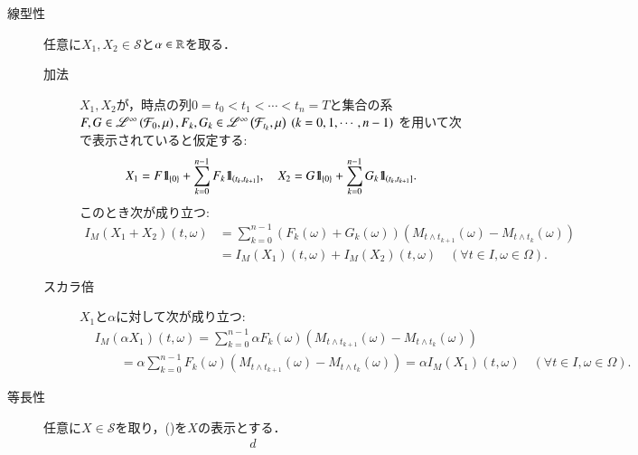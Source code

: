 	\begin{prf}\mbox{}
		\begin{description}
			\item[線型性]
				任意に$X_1,X_2 \in \mathcal{S}$と$\alpha \in \mathbb{R}$を取る．
				\begin{description}
					\item[加法]
						$X_1,X_2$が，時点の列$0=t_0<t_1<\cdots<t_n = T$と集合の系$F,G \in \mathscr{L}^{\infty} \left(\mathcal{F}_0,\mu\right),
						F_k,G_k \in \mathscr{L}^{\infty} \left(\mathcal{F}_{t_k},\mu\right)\ (k=0,1,\cdots,n-1)$
						を用いて次で表示されていると仮定する:
						\begin{align}
							X_1 = F \mbox{1}\hspace{-0.25em}\mbox{l}_{\{0\}} + \sum_{k=0}^{n-1} F_k \mbox{1}\hspace{-0.25em}\mbox{l}_{\left(t_k,t_{k+1}\right]},
							\quad X_2 = G \mbox{1}\hspace{-0.25em}\mbox{l}_{\{0\}} + \sum_{k=0}^{n-1} G_k \mbox{1}\hspace{-0.25em}\mbox{l}_{\left(t_k,t_{k+1}\right]}.
						\end{align}
						このとき次が成り立つ:
						\begin{align}
							I_M(X_1 + X_2)(t,\omega)
							&= \sum_{k=0}^{n-1} \left( F_k(\omega) + G_k(\omega) \right) \left( M_{t \wedge t_{k+1}}(\omega) - M_{t \wedge t_k}(\omega) \right) \\
							&= I_M(X_1)(t,\omega) + I_M(X_2)(t,\omega)
							\quad (\forall t \in I,\omega \in \Omega).
						\end{align}
					\item[スカラ倍]
						$X_1$と$\alpha$に対して次が成り立つ:
						\begin{align}
							&I_M(\alpha X_1)(t,\omega)
							= \sum_{k=0}^{n-1} \alpha F_k(\omega) \left(M_{t \wedge t_{k+1}}(\omega) - M_{t \wedge t_k}(\omega)\right) \\
							&\qquad= \alpha \sum_{k=0}^{n-1} F_k(\omega) \left(M_{t \wedge t_{k+1}}(\omega) - M_{t \wedge t_k}(\omega)\right)
							= \alpha I_M(X_1)(t,\omega)
							\quad (\forall t \in I,\omega \in \Omega).
						\end{align}
				\end{description}
				
			\item[等長性]
				任意に$X \in \mathcal{S}$を取り，()を$X$の表示とする．
				\begin{align}
					d
				\end{align}
		\end{description}
	\end{prf}
	

